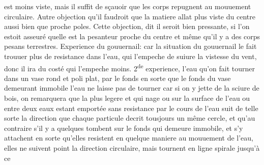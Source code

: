 est moins viste, mais il suffit de s\c{c}auoir que les corps repugnent au mouuement circulaire. Autre objection qu'il faudroit que la matiere allat plus viste
du centre aussi bien que proche
 poles.
Cette objection, dit il seroit bien pressante,
si l'on estoit asseur\'{e} quelle est la pesanteur\protect{} proche du centre et m\^{e}me qu'il y a des corps pesans terrestres.%
%
%
\pend%
\pstart%
\protect{}Experience%
du \protect{}gouuernail: car la situation du gouuernail le fait trouuer plus de resistance\protect{} dans l'eau\protect{}, qui l'empeche
de suiure la vistesse du vent\protect{}, donc il ira du cost\'{e} qui l'empeche moins.
2\textsuperscript{de} experience,\protect{} l'eau\protect{} qu'on fait tourner dans un
vase\protect{} rond et poli plat, par le fonds en sorte que le fonds du vase\protect{} demeurant immobile l'eau\protect{} ne laisse pas de tourner car
si on y jette de la sciure\protect{} de bois\protect{}, on remarquera que la plus legere et qui nage ou sur la surface de l'eau\protect{} ou entre
deux eaux\protect{} estant emport\'{e}e sans resistance\protect{} par le cours de l'eau\protect{} suit de telle sorte la direction que chaque particule\protect{}
decrit tousjours un m\^{e}me cercle, et qu'au contraire s'il y a quelques
tombent sur le fonds qui demeure immobile, et s'y attachent en sorte qu'elles resistent en quelque maniere au mouuement de \protect{}l'eau, elles ne suivent point la direction circulaire, mais tournent en ligne spirale jusqu'\`{a} ce
